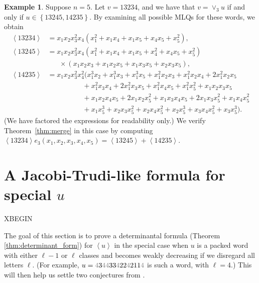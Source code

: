 \documentclass[reqno]{amsart}%
\newcommand{\0}{\phantom{c}}
\theoremstyle{plain}
\theoremstyle{definition}
\newtheorem{example}[thm]{Example}
\numberwithin{equation}{section}
\begin{document}
\begin{example}
Suppose $n = 5$. Let $v = 13234$, and we have that $v = \vee_{3} u$ if and
only if $u \in\left\{  13245, 14235 \right\}  $. By examining all possible
MLQs for these words, we obtain
\begin{align*}
\left\langle 13234 \right\rangle  &  = x_{1} x_{2} x_{3}^{2} x_{4} (x_{1}^{2}
+ x_{1} x_{4} + x_{1} x_{5} + x_{4} x_{5} + x_{5}^{2}),\\
\left\langle 13245 \right\rangle  &  = x_{1} x_{2} x_{3}^{2} x_{4} (x_{1}^{2}
+ x_{1}x_{4} + x_{1}x_{5} + x_{4}^{2} + x_{4}x_{5} + x_{5}^{2})\\
&  \hspace{20pt} \times(x_{1}x_{2}x_{3} + x_{1}x_{2}x_{5}+x_{1}x_{3}%
x_{5}+x_{2}x_{3}x_{5}),\\
\left\langle 14235 \right\rangle  &  = x_{1}x_{2}x_{3}^{2}x_{4}^{2} (x_{1}%
^{3}x_{2} + x_{1}^{3}x_{3} + x_{1}^{3}x_{5} + x_{1}^{2}x_{2}x_{3} + x_{1}%
^{2}x_{2}x_{4} + 2x_{1}^{2}x_{2}x_{5}\\
&  \hspace{60pt} + x_{1}^{2}x_{3}x_{4} + 2x_{1}^{2}x_{3}x_{5} + x_{1}^{2}%
x_{4}x_{5} + x_{1}^{2}x_{5}^{2} + x_{1}x_{2}x_{3}x_{5}\\
&  \hspace{60pt} + x_{1}x_{2}x_{4}x_{5} + 2x_{1}x_{2}x_{5}^{2} + x_{1}%
x_{3}x_{4}x_{5} + 2x_{1}x_{3}x_{5}^{2} + x_{1}x_{4}x_{5}^{2}\\
&  \hspace{60pt} + x_{1}x_{5}^{3} + x_{2}x_{3}x_{5}^{2} + x_{2}x_{4}x_{5}^{2}
+ x_{2}x_{5}^{3} + x_{3}x_{4}x_{5}^{2} + x_{3}x_{5}^{3}).
\end{align*}
(We have factored the expressions for readability only.) We verify
Theorem~\ref{thm:merge} in this case by computing $\left\langle 13234
\right\rangle e_{3}(x_{1}, x_{2}, x_{3}, x_{4}, x_{5}) = \left\langle 13245
\right\rangle + \left\langle 14235 \right\rangle $.
\end{example}



\section{A Jacobi-Trudi-like formula for special $u$}

\label{sec:JT_formula}

XBEGIN

The goal of this section is to prove a determinantal formula (Theorem
\ref{thm:determinant_form}) for $\left\langle u\right\rangle $ in the special
case when $u$ is a packed word with either $\ell-1$ or $\ell$ classes and
becomes weakly decreasing if we disregard all letters $\ell$. (For example,
$u={\color{gray}4}3{\color{gray}44}33{\color{gray}4}22{\color{gray}4}%
211{\color{gray}4}$ is such a word, with $\ell=4$.) This will then help us
settle two conjectures from \cite{AasLin17}.
\end{document}
